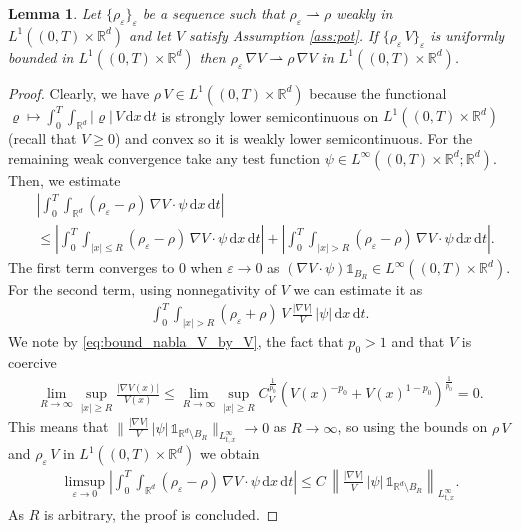 \documentclass[reqno, 11pt]{amsart}
\numberwithin{equation}{section}
\newtheorem{lem}[thm]{Lemma}
\theoremstyle{definition}
\begin{document}
\begin{lem}\label{lem:weak_conv_of_rho_nablaV}
    Let $\{\rho_{\varepsilon}\}_{\varepsilon}$ be a sequence such that $\rho_{\varepsilon} \rightharpoonup \rho$ weakly in $L^1((0,T)\times \mathbb{R}^{d})$ and let $V$ satisfy Assumption \ref{ass:pot}. If $\{\rho_{\varepsilon}\, V\}_{\varepsilon}$ is uniformly bounded in $L^1((0,T)\times \mathbb{R}^{d})$  then $\rho_{\varepsilon}\, \nabla V \rightharpoonup \rho\, \nabla V$ in $L^1((0,T)\times \mathbb{R}^{d})$.
\end{lem}
\begin{proof}
    Clearly, we have $\rho\, V \in L^1((0,T)\times\mathbb{R}^d)$ because the functional $\varrho \mapsto \int_0^T \int_{\mathbb{R}^d} |\varrho|\, V \,\mathrm{d} x \,\mathrm{d} t$ is strongly lower semicontinuous on $L^1((0,T)\times\mathbb{R}^d)$ (recall that $V\geq 0$) and convex so it is weakly lower semicontinuous. For the remaining weak convergence take any test function $\psi \in L^{\infty}((0,T)\times\mathbb{R}^d;\mathbb{R}^{d})$. Then, we estimate
    \begin{align*}
        &\left|\int_0^T \int_{\mathbb{R}^{d}} (\rho_{\varepsilon} - \rho)\, \nabla V\cdot \psi \,\mathrm{d} x \,\mathrm{d} t  \right| \\
        &\leq \left|\int_0^T \int_{|x|\leq R} (\rho_{\varepsilon} - \rho)\, \nabla V\cdot \psi \,\mathrm{d} x \,\mathrm{d} t\right| + \left|\int_0^T \int_{|x| >  R} (\rho_{\varepsilon} - \rho)\, \nabla V\cdot \psi \,\mathrm{d} x \,\mathrm{d} t\right|.
    \end{align*}
    The first term converges to 0 when $\varepsilon \to 0$ as $(\nabla V\cdot\psi)\mathds{1}_{B_R}\in L^\infty((0,T)\times \mathbb{R}^{d})$. For the second term, using nonnegativity of $V$ we can estimate it as
    \begin{align*}
        \int_0^T \int_{|x| >  R} (\rho_{\varepsilon} + \rho) \, V\,  \frac{|\nabla V|}{V} \, |\psi| \,\mathrm{d} x \,\mathrm{d} t.
    \end{align*}
    We note by
    \eqref{eq:bound_nabla_V_by_V}, the fact that $p_0>1$ and that $V$ is coercive
    \begin{align*}
        \lim_{R\to\infty}\sup_{|x|\geq R}\frac{|\nabla V(x)|}{V(x)}
        \leq \lim_{R\to\infty}\sup_{|x|\geq R}C_V^{\frac{1}{p_0}}\left(V(x)^{-p_0}+V(x)^{1-p_0}\right)^{\frac{1}{p_0}}
        =0.
    \end{align*}
    This means that $\big\|\frac{|\nabla V|}{V}\,|\psi|\,\mathds{1}_{\mathbb{R}^{d}\setminus B_R}\big\|_{L_{t,x}^\infty}\to 0$ as $R\to \infty$, so using the bounds on $\rho\, V$ and $\rho_{\varepsilon} \, V$ in $L^{1}((0,T) \times \mathbb{R}^d)$ we obtain
    \begin{align*}
        \limsup_{\varepsilon \to 0} \left|\int_0^T \int_{\mathbb{R}^{d}} (\rho_{\varepsilon} - \rho)\, \nabla V\cdot \psi \,\mathrm{d} x \,\mathrm{d} t  \right| \leq  C\,\left\|\frac{|\nabla V|}{V}\,|\psi|\,\mathds{1}_{\mathbb{R}^{d}\setminus B_R}\right\|_{L_{t,x}^\infty}.
    \end{align*}
    As $R$ is arbitrary, the proof is concluded.
\end{proof}
\end{document}
